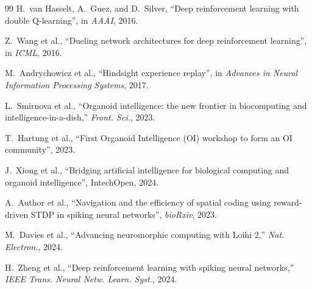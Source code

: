 \documentclass[journal]{IEEEtran}
\begin{document}
\begin{thebibliography}{99}
H.~van Hasselt, A.~Guez, and D.~Silver, ``Deep reinforcement learning with double Q-learning”, in \emph{AAAI}, 2016.

Z.~Wang et al., ``Dueling network architectures for deep reinforcement learning”, in \emph{ICML}, 2016.

M.~Andrychowicz et al., ``Hindsight experience replay”, in \emph{Advances in Neural Information Processing Systems}, 2017.

L.~Smirnova et al., ``Organoid intelligence: the new frontier in biocomputing and intelligence-in-a-dish,'' \emph{Front. Sci.}, 2023.

T.~Hartung et al., ``First Organoid Intelligence (OI) workshop to form an OI community”, 2023.

J.~Xiong et al., ``Bridging artificial intelligence for biological computing and organoid intelligence”, IntechOpen, 2024.

A.~Author et al., ``Navigation and the efficiency of spatial coding using reward-driven STDP in spiking neural networks”, \emph{bioRxiv}, 2023.

M.~Davies et al., ``Advancing neuromorphic computing with Loihi 2,'' \emph{Nat. Electron.}, 2024.

H.~Zheng et al., ``Deep reinforcement learning with spiking neural networks,'' \emph{IEEE Trans. Neural Netw. Learn. Syst.}, 2024.

\end{thebibliography}
\end{document}
